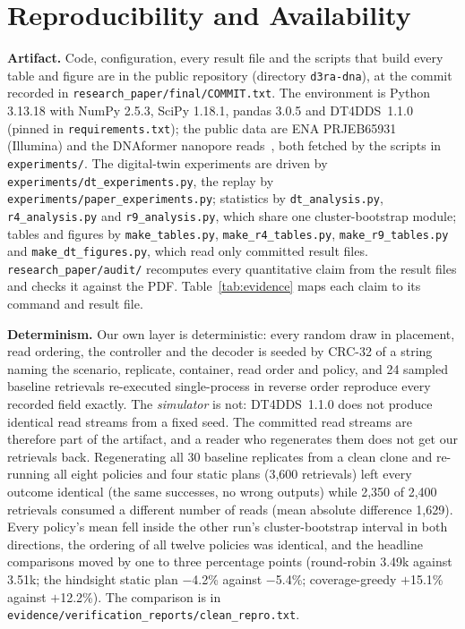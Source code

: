 \documentclass[acmsmall,screen]{acmart}
\begin{document}
\section{Reproducibility and Availability}\label{sec:repro}
\textbf{Artifact.}  Code, configuration, every result file and the scripts that build every table and
figure are in the public repository  (directory
\texttt{d3ra-dna}), at the commit recorded in \texttt{research\_paper/final/COMMIT.txt}.  The environment
is Python 3.13.18 with NumPy 2.5.3, SciPy 1.18.1, pandas 3.0.5 and DT4DDS~1.1.0 (pinned in
\texttt{requirements.txt}); the public data are ENA PRJEB65931~\cite{gimpel2023prjeb65931} (Illumina) and
the DNAformer nanopore reads~\cite{technion2025dnaformerreads,barlev2024binned}, both fetched by the scripts
in \texttt{experiments/}.  The digital-twin experiments are driven by
\texttt{experiments/dt\_experiments.py}, the replay by \texttt{experiments/paper\_experiments.py};
statistics by \texttt{dt\_analysis.py}, \texttt{r4\_analysis.py} and \texttt{r9\_analysis.py}, which share
one cluster-bootstrap module; tables and figures by \texttt{make\_tables.py}, \texttt{make\_r4\_tables.py},
\texttt{make\_r9\_tables.py} and \texttt{make\_dt\_figures.py}, which read only committed result files.
\texttt{research\_paper/audit/} recomputes every quantitative claim from the result files and checks it
against the PDF.  Table~\ref{tab:evidence} maps each claim to its command and result file.

\textbf{Determinism.}  Our own layer is deterministic: every random draw in placement, read ordering, the
controller and the decoder is seeded by CRC-32 of a string naming the scenario, replicate, container, read
order and policy, and 24 sampled baseline retrievals re-executed single-process in reverse order reproduce
every recorded field exactly.  The \emph{simulator} is not: DT4DDS~1.1.0 does not produce identical read
streams from a fixed seed.  The committed read streams are therefore part of the artifact, and a reader
who regenerates them does not get our retrievals back.  Regenerating all 30 baseline replicates from a
clean clone and re-running all eight policies and four static plans (3{,}600 retrievals) left every
outcome identical (the same successes, no wrong outputs) while 2{,}350 of 2{,}400 retrievals consumed a
different number of reads (mean absolute difference 1{,}629).  Every policy's mean fell inside the other
run's cluster-bootstrap interval in both directions, the ordering of all twelve policies was identical,
and the headline comparisons moved by one to three percentage points (round-robin 3.49k against 3.51k;
the hindsight static plan $-$4.2\% against $-$5.4\%; coverage-greedy $+$15.1\% against $+$12.2\%).  The
comparison is in \texttt{evidence/}\allowbreak\texttt{verification\_reports/}\allowbreak\texttt{clean\_repro.txt}.
\end{document}

